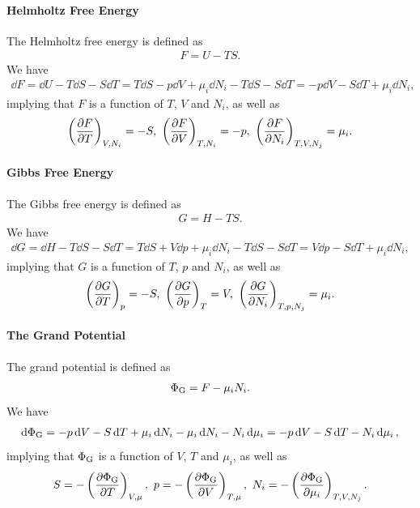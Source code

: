 \paragraph{Helmholtz Free Energy}
The Helmholtz free energy is defined as
\begin{align*}
	F = U - TS.
\end{align*}
We have
\begin{align*}
	\dd{F} = \dd{U} - T\dd{S} - S\dd{T} = T\dd{S} - p\dd{V} + \mu_{i}\dd{N_{i}} - T\dd{S} - S\dd{T} = -p\dd{V} - S\dd{T} + \mu_{i}\dd{N_{i}},
\end{align*}
implying that $F$ is a function of $T$, $V$ and $N_{i}$, as well as
\begin{align*}
	\fix{\pdv{F}{T}}{V, N_{i}} = -S,\ \fix{\pdv{F}{V}}{T, N_{i}} = -p,\ \fix{\pdv{F}{N_{i}}}{T, V,  N_{j}} = \mu_{i}.
\end{align*}

\paragraph{Gibbs Free Energy}
The Gibbs free energy is defined as
\begin{align*}
	G = H - TS.
\end{align*}
We have
\begin{align*}
	\dd{G} = \dd{H} - T\dd{S} - S\dd{T} = T\dd{S} + V\dd{p} + \mu_{i}\dd{N_{i}} - T\dd{S} - S\dd{T} = V\dd{p} - S\dd{T} + \mu_{i}\dd{N_{i}},
\end{align*}
implying that $G$ is a function of $T$, $p$ and $N_{i}$, as well as
\begin{align*}
	\fix{\pdv{G}{T}}{p} = -S,\ \fix{\pdv{G}{p}}{T} = V,\ \fix{\pdv{G}{N_{i}}}{T, p,  N_{j}} = \mu_{i}.
\end{align*}

\paragraph{The Grand Potential}
The grand potential is defined as
\begin{align*}
	\Phi_{\text{G}} = F - \mu_{i}N_{i}.
\end{align*}
We have
\begin{align*}
	\dd{\Phi_{\text{G}}} = -p\dd{V} - S\dd{T} + \mu_{i}\dd{N_{i}} - \mu_{i}\dd{N_{i}} - N_{i}\dd{\mu_{i}} = -p\dd{V} - S\dd{T} - N_{i}\dd{\mu_{i}},
\end{align*}
implying that $\Phi_{\text{G}}$ is a function of $V$, $T$ and $\mu_{i}$, as well as
\begin{align*}
	S = - \left(\pdv{\Phi_{\text{G}}}{T}\right)_{V, \mu},\ p = - \left(\pdv{\Phi_{\text{G}}}{V}\right)_{T, \mu},\ N_{i} = - \left(\pdv{\Phi_{\text{G}}}{\mu_{i}}\right)_{T, V, N_{j}}.
\end{align*}

